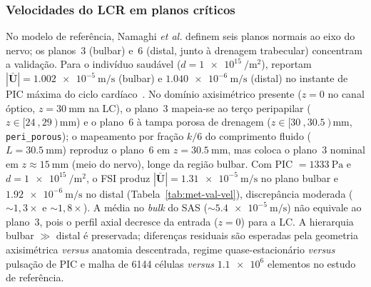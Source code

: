 
\subsubsection*{Velocidades do LCR em planos críticos}

No modelo de referência, Namaghi \textit{et al.} definem seis planos normais ao eixo do nervo; os planos~3 (bulbar) e~6 (distal, junto à drenagem trabecular) concentram a validação. Para o indivíduo saudável ($d = \SI{1e15}{\per\meter\squared}$), reportam $|\bar{\mathbf{U}}| = \SI{1.002e-5}{\meter\per\second}$ (bulbar) e $\SI{1.040e-6}{\meter\per\second}$ (distal) no instante de PIC máxima do ciclo cardíaco~\cite{namaghi2026}. No domínio axisimétrico presente ($z = 0$ no canal óptico, $z = \SI{30}{\milli\meter}$ na LC), o plano~3 mapeia-se ao terço peripapilar ($z \in [\SI{24}{},\SI{29}{})\,\si{\milli\meter}$) e o plano~6 à tampa porosa de drenagem ($z \in [\SI{30}{},\SI{30.5}{})\,\si{\milli\meter}$, \texttt{peri\_porous}); o mapeamento por fração $k/6$ do comprimento fluido ($L = \SI{30.5}{\milli\meter}$) reproduz o plano~6 em $z = \SI{30.5}{\milli\meter}$, mas coloca o plano~3 nominal em $z \approx \SI{15}{\milli\meter}$ (meio do nervo), longe da região bulbar. Com PIC $= \SI{1333}{\pascal}$ e $d = \SI{1e15}{\per\meter\squared}$, o FSI produz $|\bar{\mathbf{U}}| = \SI{1.31e-5}{\meter\per\second}$ no plano bulbar e $\SI{1.92e-6}{\meter\per\second}$ no distal (Tabela~\ref{tab:met-val-vel}), discrepância moderada ($\sim 1{,}3\times$ e $\sim 1{,}8\times$). A média no \emph{bulk} do SAS ($\sim \SI{5.4e-5}{\meter\per\second}$) não equivale ao plano~3, pois o perfil axial decresce da entrada ($z = 0$) para a LC. A hierarquia bulbar $\gg$ distal é preservada; diferenças residuais são esperadas pela geometria axisimétrica \textit{versus} anatomia descentrada, regime quase-estacionário \textit{versus} pulsação de PIC e malha de \num{6144} células \textit{versus} $\num{1.1e6}$ elementos no estudo de referência.

